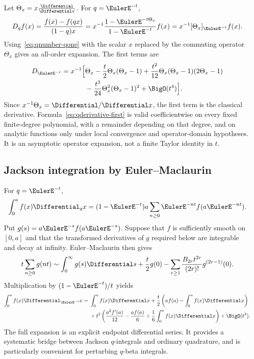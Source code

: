 \documentclass[11pt,oneside]{article}
\theoremstyle{definition}
\theoremstyle{remark}
\let\reportsubsection\subsection
\let\section\reportsubsection
\begin{document}
Let $\Theta_x=x\frac{\Differential}{\Differential x}$.  For $q=\EulerE^{-t}$,
\begin{equation}\label{eq:qderivative-operator}
 D_qf(x)=\frac{f(x)-f(qx)}{(1-q)x}
 =x^{-1}\frac{1-\EulerE^{-t\Theta_x}}{1-\EulerE^{-t}}f(x)
 =x^{-1}[\Theta_x]_{\EulerE^{-t}}f(x).
\end{equation}
Using~\eqref{eq:qnumber-qone} with the scalar $x$ replaced by the commuting
operator $\Theta_x$ gives an all-order expansion.  The first terms are
\begin{align}
 D_{\EulerE^{-t}}
 =x^{-1}\Bigl[&\Theta_x
 -\frac{t}{2}\Theta_x(\Theta_x-1)
 +\frac{t^2}{12}\Theta_x(\Theta_x-1)(2\Theta_x-1)
 \notag\\
 &-\frac{t^3}{24}\Theta_x^2(\Theta_x-1)^2
 +\BigO(t^4)\Bigr].                                \label{eq:qderivative-first}
\end{align}
Since $x^{-1}\Theta_x=\Differential/\Differential x$, the first term is the classical derivative.
Formula~\eqref{eq:qderivative-first} is valid coefficientwise on every fixed
finite-degree polynomial, with a remainder depending on that degree, and on
analytic functions only under local convergence and operator-domain
hypotheses.  It is an asymptotic operator expansion, not a finite Taylor
identity in $t$.

\section{Jackson integration by Euler--Maclaurin}

For $q=\EulerE^{-t}$,
\[
 \int_0^a f(x)\Differential_qx
 =(1-\EulerE^{-t})a\sum_{n\ge0}\EulerE^{-nt}f(a\EulerE^{-nt}).
\]
Put $g(s)=a\EulerE^{-s}f(a\EulerE^{-s})$.  Suppose that $f$ is sufficiently smooth on
$[0,a]$ and that the transformed derivatives of $g$ required below are
integrable and decay at infinity.  Euler--Maclaurin then gives
\begin{align}
 t\sum_{n\ge0}g(nt)
 \sim\int_0^\infty g(s)\Differential s+\frac t2g(0)
 -\sum_{r\ge1}\frac{B_{2r}t^{2r}}{(2r)!}g^{(2r-1)}(0).
 \label{eq:jackson-em}
\end{align}
Multiplication by $(1-\EulerE^{-t})/t$ yields
\begin{align}
 \int_0^a f(x)\Differential_{\EulerE^{-t}}x
 ={}&\int_0^a f(x)\Differential x
 +\frac t2\left(af(a)-\int_0^a f(x)\Differential x\right)
 \notag\\
 &+t^2\left(
 \frac{a^2f'(a)}{12}-\frac{af(a)}6
 +\frac16\int_0^a f(x)\Differential x\right)+\BigO(t^3).
 \label{eq:jackson-first}
\end{align}
The full expansion is an explicit endpoint differential series.  It provides a
systematic bridge between Jackson $q$-integrals and ordinary quadrature, and is
particularly convenient for perturbing $q$-beta integrals.
\end{document}
